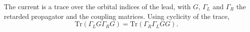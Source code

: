 \documentclass{article}
\begin{document}
The current is a trace over the orbital indices of the lead, with $G$, $\Gamma_L$ and $\Gamma_R$
the retarded propagator and the coupling matrices. Using cyclicity of the trace,
\begin{equation}
\mathrm{Tr}\left(\Gamma_L G \Gamma_R G\right) = \mathrm{Tr}\left(\Gamma_R \Gamma_L G G\right) .
\label{eq:tr}
\end{equation}
\end{document}
